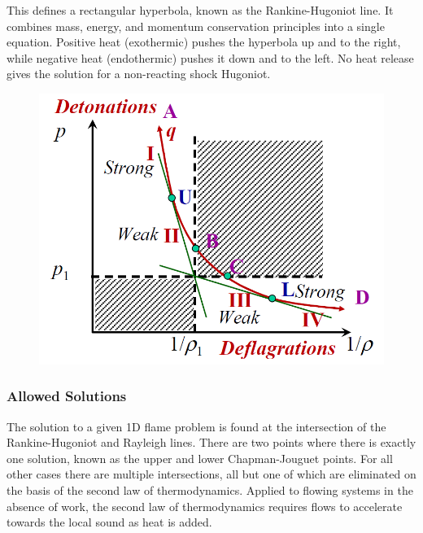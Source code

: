 \documentclass[11pt]{article}
\begin{document}
This defines a rectangular hyperbola, known as the Rankine-Hugoniot line. It combines mass, energy, and momentum conservation principles into a single equation. Positive heat (exothermic) pushes the hyperbola up and to the right, while negative heat (endothermic) pushes it down and to the left. No heat release gives the solution for a non-reacting shock Hugoniot.
\begin{figure}[h]
\centering
\includegraphics[scale=0.5]{Graphics/detonations_deflagrations.png}
\end{figure}

\subsubsection{Allowed Solutions}
The solution to a given 1D flame problem is found at the intersection of the Rankine-Hugoniot and Rayleigh lines. There are two points where there is exactly one solution, known as the upper and lower Chapman-Jouguet points. For all other cases there are multiple intersections, all but one of which are eliminated on the basis of the second law of thermodynamics. Applied to flowing systems in the absence of work, the second law of thermodynamics requires flows to accelerate towards the local sound as heat is added.
\end{document}

